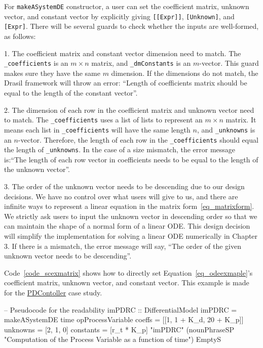 For \verb|makeASystemDE| constructor, a user can set the coefficient matrix, unknown vector, and constant vector by explicitly giving \verb|[[Expr]]|, \verb|[Unknown]|, and \verb|[Expr]|. There will be several guards to check whether the inputs are well-formed, as follows:

1. The coefficient matrix and constant vector dimension need to match. The \verb|_coefficients| is an $m \times n$ matrix, and \verb|_dmConstants| is an $m$-vector. This guard makes sure they have the same $m$ dimension. If the dimensions do not match, the Drasil framework will throw an error: ``Length of coefficients matrix should be equal to the length of the constant vector''.

2. The dimension of each row in the coefficient matrix and unknown vector need to match. The \verb|_coefficients| uses a list of lists to represent an $m \times n$ matrix. It means each list in \verb|_coefficients| will have the same length $n$, and \verb|_unknowns| is an $n$-vector. Therefore, the length of each row in the \verb|_coefficients| should equal the length of \verb|_unknowns|. In the case of a size mismatch, the error message is:``The length of each row vector in coefficients needs to be equal to the length of the unknown vector''.

3. The order of the unknown vector needs to be descending due to our design decisions. We have no control over what users will give to us, and there are infinite ways to represent a linear equation in the matrix form~\ref{eq_matrixform}. We strictly ask users to input the unknown vector in descending order so that we can maintain the shape of a normal form of a linear ODE. This design decision will simplify the implementation for solving a linear ODE numerically in Chapter 3. If there is a mismatch, the error message will say, ``The order of the given unknown vector needs to be descending''.

Code~\ref{code_scexmatrix} shows how to directly set Equation~\ref{eq_odeexmaple}'s coefficient matrix, unknown vector, and constant vector. This example is made for the \href{https://jacquescarette.github.io/Drasil/examples/pdcontroller/SRS/srs/PDController_SRS.html}{PDContoller} case study.

\begin{listing}[ht]
\begin{haskell1}
-- Pseudocode for the readability
imPDRC :: DifferentialModel
imPDRC = makeASystemDE
	time
	opProcessVariable
	coeffs = [[1, 1 + K_d, 20 + K_p]]
	unknowns = [2, 1, 0]
	constants = [r_t * K_p]
	"imPDRC"
	(nounPhraseSP "Computation of the Process Variable as a function of time")
	EmptyS
\end{haskell1}
\label{code_scexmatrix}
\end{listing}

